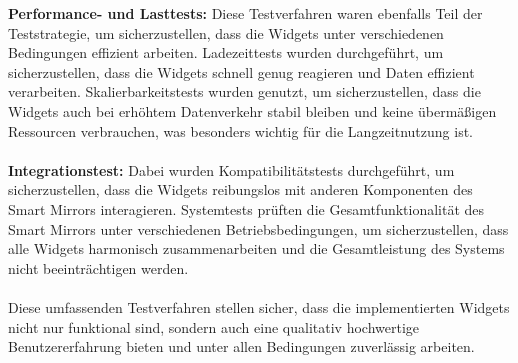 \noindent
\textbf{Performance- und Lasttests:} Diese Testverfahren waren ebenfalls Teil der Teststrategie, um sicherzustellen, dass die Widgets unter verschiedenen Bedingungen effizient arbeiten. Ladezeittests wurden durchgeführt, um sicherzustellen, dass die Widgets schnell genug reagieren und Daten effizient verarbeiten. Skalierbarkeitstests wurden genutzt, um sicherzustellen, dass die Widgets auch bei erhöhtem Datenverkehr stabil bleiben und keine übermäßigen Ressourcen verbrauchen, was besonders wichtig für die Langzeitnutzung ist. \\ \\
\newpage
\noindent
\textbf{Integrationstest:} Dabei wurden Kompatibilitätstests durchgeführt, um sicherzustellen, dass die Widgets reibungslos mit anderen Komponenten des Smart Mirrors interagieren. Systemtests prüften die Gesamtfunktionalität des Smart Mirrors unter verschiedenen Betriebsbedingungen, um sicherzustellen, dass alle Widgets harmonisch zusammenarbeiten und die Gesamtleistung des Systems nicht beeinträchtigen werden. \\ \\
\noindent
Diese umfassenden Testverfahren stellen sicher, dass die implementierten Widgets nicht nur funktional sind, sondern auch eine qualitativ hochwertige Benutzererfahrung bieten und unter allen Bedingungen zuverlässig arbeiten.




